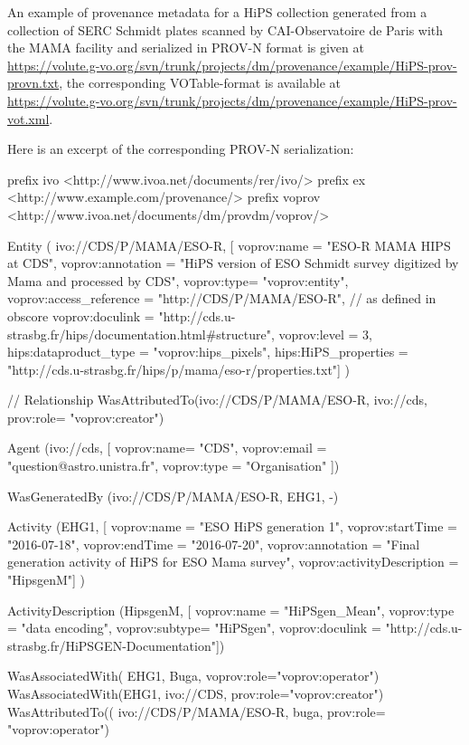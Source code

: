 An example of provenance metadata for a HiPS collection generated from a collection of SERC Schmidt plates scanned by CAI-Observatoire de Paris with the MAMA facility and serialized in PROV-N format is given at \\\footnotesize
\footnotesize{\url{https://volute.g-vo.org/svn/trunk/projects/dm/provenance/example/HiPS-prov-provn.txt}}, the corresponding VOTable-format is available at \\
\url{https://volute.g-vo.org/svn/trunk/projects/dm/provenance/example/HiPS-prov-vot.xml}.

Here is an excerpt of the corresponding PROV-N serialization:

\begin{verbnobox}[\scriptsize]
prefix ivo <http://www.ivoa.net/documents/rer/ivo/>
prefix ex <http://www.example.com/provenance/>
prefix voprov <http://www.ivoa.net/documents/dm/provdm/voprov/>

Entity
( ivo://CDS/P/MAMA/ESO-R, 
[ voprov:name = "ESO-R MAMA HIPS at CDS",
voprov:annotation = "HiPS version of ESO Schmidt survey digitized by Mama and processed by CDS",
voprov:type= "voprov:entity",
voprov:access_reference = "http://CDS/P/MAMA/ESO-R", // as defined in obscore 
voprov:doculink = "http://cds.u-strasbg.fr/hips/documentation.html#structure",
voprov:level = 3,
hips:dataproduct_type = "voprov:hips_pixels",
hips:HiPS_properties = "http://cds.u-strasbg.fr/hips/p/mama/eso-r/properties.txt"] )

// Relationship
WasAttributedTo(ivo://CDS/P/MAMA/ESO-R, ivo://cds, prov:role= "voprov:creator")

Agent
(ivo://cds,
[ voprov:name= "CDS",
voprov:email = "question@astro.unistra.fr",
voprov:type = "Organisation" ]) 

WasGeneratedBy  (ivo://CDS/P/MAMA/ESO-R, EHG1, -) 

Activity
(EHG1,
[ voprov:name = "ESO HiPS generation 1",
voprov:startTime = "2016-07-18", 
voprov:endTime = "2016-07-20",
voprov:annotation = "Final generation activity of HiPS for ESO Mama survey",
voprov:activityDescription = "HipsgenM"] )
 
ActivityDescription 
(HipsgenM,
[ voprov:name = "HiPSgen_Mean",
voprov:type = "data encoding",
voprov:subtype= "HiPSgen",
voprov:doculink = "http://cds.u-strasbg.fr/HiPSGEN-Documentation"])

WasAssociatedWith( EHG1, Buga, voprov:role="voprov:operator")
WasAssociatedWith(EHG1, ivo://CDS, prov:role="voprov:creator")
WasAttributedTo(( ivo://CDS/P/MAMA/ESO-R, buga, prov:role= "voprov:operator")
\end{verbnobox}
